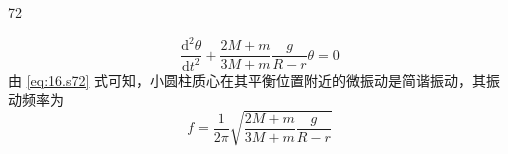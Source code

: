 \begin{solution}{72}
\begin{subsolution}
        \begin{equation}
            \frac{\mathrm{d}^{2} \theta}{\mathrm{d} t^{2}} + \frac{2 M + m}{3 M + m} \frac{g}{R - r} \theta = 0
            \label{eq:16.s72}
        \end{equation}
        由 \eqref{eq:16.s72} 式可知，小圆柱质心在其平衡位置附近的微振动是简谐振动，其振动频率为
        \begin{equation}
            f = \frac{1}{2 \pi} \sqrt{\frac{2 M + m}{3 M + m} \frac{g}{R - r}}
            \label{eq:17.s72}
        \end{equation}
    \end{subsolution}
\end{solution}













